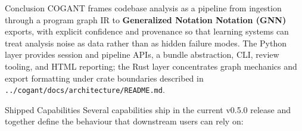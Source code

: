 \documentclass[
  ignorenonframetext,
]{beamer}
\author{\texorpdfstring{}{}}
\date{}
\begin{document}
\begin{frame}[fragile]{Conclusion}
\protect{}\label{conclusion}
COGANT frames codebase analysis as a pipeline from ingestion through a
program graph IR to \textbf{Generalized Notation Notation (GNN)}
exports, with explicit confidence and provenance so that learning
systems can treat analysis noise as data rather than as hidden failure
modes. The Python layer provides session and pipeline APIs, a bundle
abstraction, CLI, review tooling, and HTML reporting; the Rust layer
concentrates graph mechanics and export formatting under crate
boundaries described in \texttt{../cogant/docs/architecture/README.md}.

\begin{block}{Shipped Capabilities}
\protect{}\label{shipped-capabilities}
Several capabilities ship in the current v0.5.0 release and together
define the behaviour that downstream users can rely on:


\end{block}
\end{frame}
\end{document}
